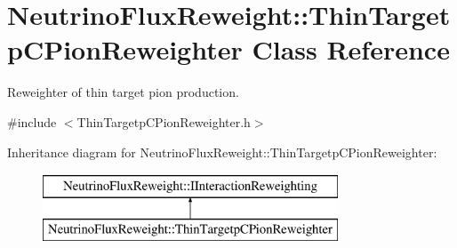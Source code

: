 \hypertarget{class_neutrino_flux_reweight_1_1_thin_targetp_c_pion_reweighter}{\section{Neutrino\-Flux\-Reweight\-:\-:Thin\-Targetp\-C\-Pion\-Reweighter Class Reference}
\label{class_neutrino_flux_reweight_1_1_thin_targetp_c_pion_reweighter}
}


Reweighter of thin target pion production.  




{\ttfamily \#include $<$Thin\-Targetp\-C\-Pion\-Reweighter.\-h$>$}

Inheritance diagram for Neutrino\-Flux\-Reweight\-:\-:Thin\-Targetp\-C\-Pion\-Reweighter\-:\begin{figure}[H]
\begin{center}
\leavevmode
\includegraphics[height=2.000000cm]{class_neutrino_flux_reweight_1_1_thin_targetp_c_pion_reweighter}
\end{center}
\end{figure}

